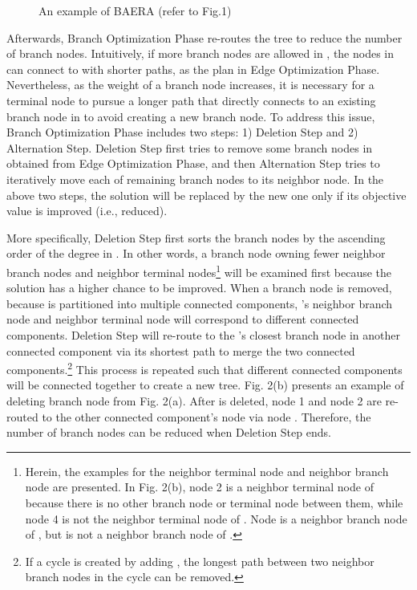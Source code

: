 \documentclass[conference]{IEEEtran}
\begin{document}
\begin{figure}[t]
\centering
{}
\smallskip
{}
\caption{An example of BAERA (refer to Fig.1)}
\label{fig2:subfig}
\end{figure}

Afterwards, Branch Optimization Phase re-routes the tree  to reduce the
number of branch nodes. Intuitively, if more branch nodes are allowed in , the nodes in  can connect to  with shorter paths, as
the plan in Edge Optimization Phase. Nevertheless, as the weight  of a
branch node increases, it is necessary for a terminal node to pursue a
longer path that directly connects to an existing branch node in  to
avoid creating a new branch node. To address this issue, Branch Optimization
Phase includes two steps: 1) Deletion Step and 2) Alternation Step. Deletion
Step first tries to remove some branch nodes in  obtained from Edge
Optimization Phase, and then Alternation Step tries to iteratively move each of remaining branch nodes to its neighbor node. In the above two steps, the
solution  will be replaced by the new one only if its objective value  is improved (i.e., reduced).

More specifically, Deletion Step first sorts the branch nodes by the ascending order of the
degree in . In other words, a branch node owning fewer neighbor branch
nodes and neighbor terminal nodes\footnote{Herein, the examples for the neighbor terminal node and neighbor branch node are presented. In Fig. 2(b), node 2 is a neighbor terminal node of  because there is
no other branch node or terminal node between them, while node 4 is not the neighbor terminal node of . Node  is a neighbor branch node of , but is not a neighbor branch node of .}
will be examined first because the solution has a higher chance to be
improved.
When a branch node  is removed, because  is partitioned into multiple connected components, 's neighbor branch node and neighbor terminal node will correspond to different
connected components.
Deletion Step will re-route  to the 's closest branch node  in another connected component via its shortest path  to merge the two
connected components.\footnote{If a cycle is created by adding , the longest path between two
neighbor branch nodes in the cycle can be removed.} This process is repeated
such that different connected components will be connected together to
create a new tree.
Fig. 2(b) presents an example of deleting branch node  from Fig. 2(a).
After  is deleted, node 1 and node 2 are re-routed to the other connected component's node  via node . Therefore, the number of
branch nodes can be reduced when Deletion Step ends.
\end{document}
